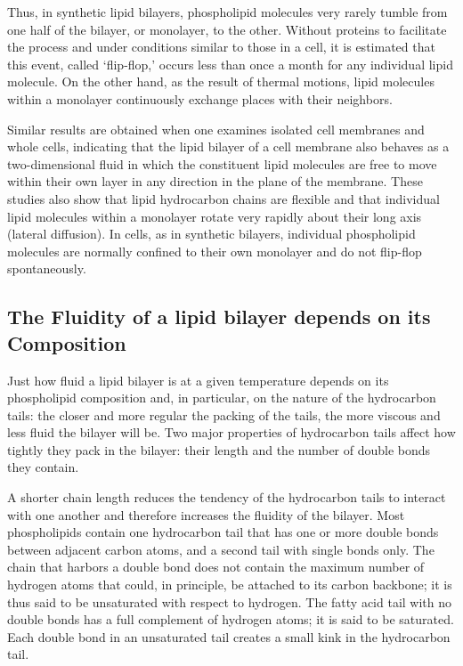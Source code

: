Thus, in synthetic lipid bilayers, phospholipid molecules very rarely tumble from one half of the bilayer,
or monolayer, to the other. Without proteins to facilitate the process
and under conditions similar to those in a cell, it is estimated that this
event, called ‘flip-flop,’ occurs less than once a month for any individual
lipid molecule. On the other hand, as the result of thermal motions, lipid
molecules within a monolayer continuously exchange places with their neighbors.

Similar results are obtained when one examines isolated cell membranes
and whole cells, indicating that the lipid bilayer of a cell membrane
also behaves as a two-dimensional fluid in which the constituent lipid
molecules are free to move within their own layer in any direction in the
plane of the membrane. These studies also show that lipid hydrocarbon
chains are flexible and that individual lipid molecules within a monolayer
rotate very rapidly about their long axis (lateral diffusion). In cells, as in synthetic bilayers,
individual phospholipid molecules are normally confined to their own
monolayer and do not flip-flop spontaneously.

\subsection{The Fluidity of a lipid bilayer depends on its Composition}

Just how fluid a lipid
bilayer is at a given temperature depends on its phospholipid composition 
and, in particular, on the nature of the hydrocarbon tails: the closer
and more regular the packing of the tails, the more viscous and less fluid
the bilayer will be. Two major properties of hydrocarbon tails affect how
tightly they pack in the bilayer: their length and the number of double
bonds they contain.

A shorter chain length reduces the tendency of the hydrocarbon tails
to interact with one another and therefore increases the fluidity of the
bilayer.
Most phospholipids contain one hydrocarbon tail that has one or more
double bonds between adjacent carbon atoms, and a second tail with
single bonds only. The chain that harbors a double bond
does not contain the maximum number of hydrogen atoms that could, in
principle, be attached to its carbon backbone; it is thus said to be unsaturated 
with respect to hydrogen. The fatty acid tail with no double bonds
has a full complement of hydrogen atoms; it is said to be saturated. Each
double bond in an unsaturated tail creates a small kink in the hydrocarbon tail.

